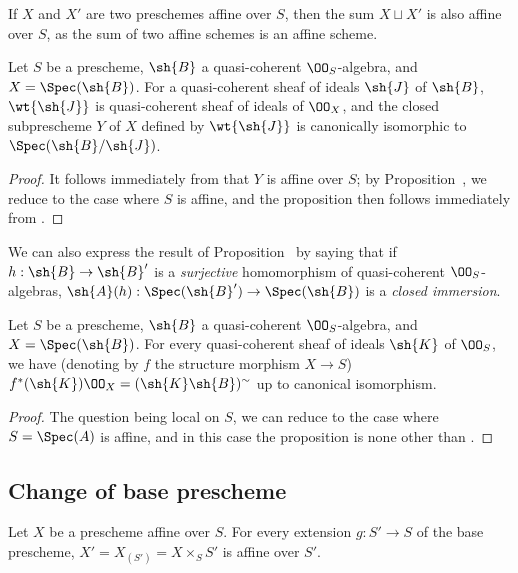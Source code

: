 \begin{rmk}[1.4.9]
\label{2.1.4.9}
If $X$ and $X'$ are two preschemes affine over $S$, then the sum $X\sqcup X'$ is also affine over $S$, as the sum of two affine schemes is an affine scheme.
\end{rmk}

\begin{prop}[1.4.10]
\label{2.1.4.10}
Let $S$ be a prescheme, $\sh{B}$ a quasi-coherent $\OO_S$-algebra, and $X=\Spec(\sh{B})$.
For a quasi-coherent sheaf of ideals $\sh{J}$ of $\sh{B}$, $\wt{\sh{J}}$ is quasi-coherent sheaf of ideals of $\OO_X$, and the closed subprescheme $Y$ of $X$ defined by $\wt{\sh{J}}$ is canonically isomorphic to $\Spec(\sh{B}/\sh{J})$.
\end{prop}

\begin{proof}
\label{proof-2.1.4.10}
It follows immediately from  that $Y$ is affine over $S$; by Proposition~, we reduce to the case where $S$ is affine, and the proposition then follows immediately from .
\end{proof}

We can also express the result of Proposition~ by saying that if $h:\sh{B}\to\sh{B}'$ is a \emph{surjective} homomorphism of quasi-coherent $\OO_S$-algebras, $\sh{A}(h):\Spec(\sh{B}')\to\Spec(\sh{B})$ is a \emph{closed immersion}.

\begin{prop}[1.4.11]
\label{2.1.4.11}
Let $S$ be a prescheme, $\sh{B}$ a quasi-coherent $\OO_S$-algebra, and $X=\Spec(\sh{B})$.
For every quasi-coherent sheaf of ideals $\sh{K}$ of $\OO_S$, we have (denoting by $f$ the structure morphism $X\to S$) $f^*(\sh{K})\OO_X=(\sh{K}\sh{B})^\sim$ up to canonical isomorphism.
\end{prop}

\begin{proof}
\label{proof-2.1.4.11}
The question being local on $S$, we can reduce to the case where $S=\Spec(A)$ is affine, and in this case the proposition is none other than .
\end{proof}

\subsection{Change of base prescheme}
\label{subsection:change-of-base-prescheme}

\begin{prop}[1.5.1]
\label{2.1.5.1}
Let $X$ be a prescheme affine over $S$.
For every extension $g:S'\to S$ of the base prescheme, $X'=X_{(S')}=X\times_S S'$ is affine over $S'$.
\end{prop}

